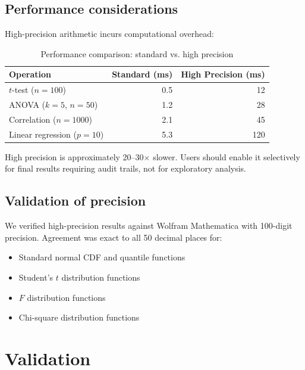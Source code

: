 \documentclass[article]{jss}
\begin{document}
\subsection{Performance considerations}

High-precision arithmetic incurs computational overhead:

\begin{table}[htbp]
\centering
\caption{Performance comparison: standard vs. high precision}
\label{tab:performance}
\begin{tabular}{lrr}
\toprule
Operation & Standard (ms) & High Precision (ms) \\
\midrule
$t$-test ($n=100$) & 0.5 & 12 \\
ANOVA ($k=5$, $n=50$) & 1.2 & 28 \\
Correlation ($n=1000$) & 2.1 & 45 \\
Linear regression ($p=10$) & 5.3 & 120 \\
\bottomrule
\end{tabular}
\end{table}

High precision is approximately 20--30$\times$ slower. Users should enable it selectively for final results requiring audit trails, not for exploratory analysis.

\subsection{Validation of precision}

We verified high-precision results against Wolfram Mathematica with 100-digit precision. Agreement was exact to all 50 decimal places for:

\begin{itemize}
\item Standard normal CDF and quantile functions
\item Student's $t$ distribution functions
\item $F$ distribution functions
\item Chi-square distribution functions
\end{itemize}


\section{Validation} \label{sec:validation}
\end{document}
